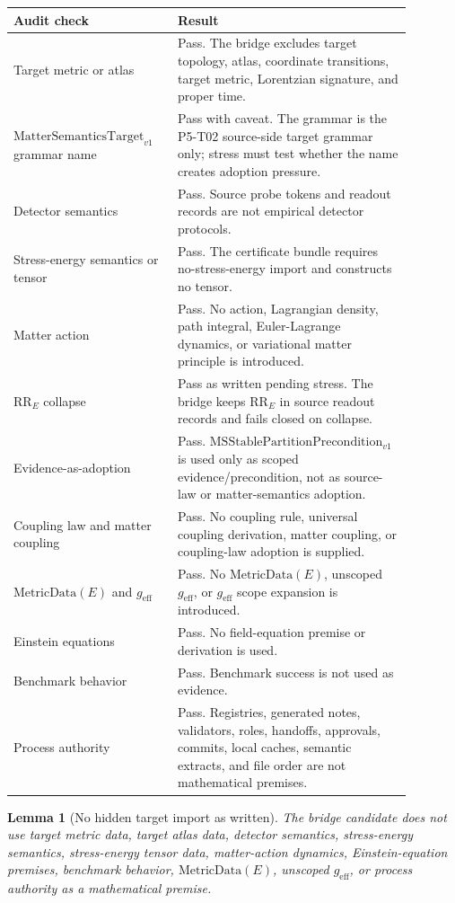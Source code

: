 \documentclass[11pt]{article}
\newcommand{\MSStablePre}{\mathrm{MSStablePartitionPrecondition}_{v1}}
\newcommand{\Target}{\mathrm{MatterSemanticsTarget}_{v1}}
\newcommand{\MetricData}{\mathrm{MetricData}}
\newcommand{\geff}{g_{\mathrm{eff}}}
\newtheorem{lemma}{Lemma}
\begin{document}
\begin{longtable}{p{0.34\linewidth}p{0.54\linewidth}}
\toprule
Audit check & Result \\
\midrule
Target metric or atlas & Pass. The bridge excludes target topology, atlas,
coordinate transitions, target metric, Lorentzian signature, and proper time. \\
\(\Target\) grammar name & Pass with caveat. The grammar is the P5-T02
source-side target grammar only; stress must test whether the name creates
adoption pressure. \\
Detector semantics & Pass. Source probe tokens and readout records are not
empirical detector protocols. \\
Stress-energy semantics or tensor & Pass. The certificate bundle requires
no-stress-energy import and constructs no tensor. \\
Matter action & Pass. No action, Lagrangian density, path integral,
Euler-Lagrange dynamics, or variational matter principle is introduced. \\
\(\mathrm{RR}_E\) collapse & Pass as written pending stress. The bridge keeps
\(\mathrm{RR}_E\) in source readout records and fails closed on collapse. \\
Evidence-as-adoption & Pass. \(\MSStablePre\) is used only as scoped
evidence/precondition, not as source-law or matter-semantics adoption. \\
Coupling law and matter coupling & Pass. No coupling rule, universal coupling
derivation, matter coupling, or coupling-law adoption is supplied. \\
\(\MetricData(E)\) and \(\geff\) & Pass. No \(\MetricData(E)\), unscoped
\(\geff\), or \(\geff\) scope expansion is introduced. \\
Einstein equations & Pass. No field-equation premise or derivation is used. \\
Benchmark behavior & Pass. Benchmark success is not used as evidence. \\
Process authority & Pass. Registries, generated notes, validators, roles,
handoffs, approvals, commits, local caches, semantic extracts, and file order
are not mathematical premises. \\
\bottomrule
\end{longtable}

\begin{lemma}[No hidden target import as written]
The bridge candidate does not use target metric data, target atlas data,
detector semantics, stress-energy semantics, stress-energy tensor data,
matter-action dynamics, Einstein-equation premises, benchmark behavior,
\(\MetricData(E)\), unscoped \(\geff\), or process authority as a
mathematical premise.
\end{lemma}
\end{document}
